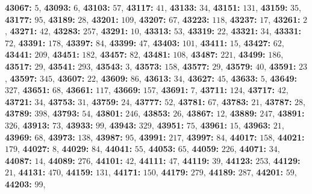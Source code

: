 \textsf{\bfseries 43067:} $5$, \textsf{\bfseries 43093:} $6$, \textsf{\bfseries 43103:} $57$, \textsf{\bfseries 43117:} $41$, \textsf{\bfseries 43133:} $34$, \textsf{\bfseries 43151:} $131$, \textsf{\bfseries 43159:} $35$, \textsf{\bfseries 43177:} $95$, \textsf{\bfseries 43189:} $28$, \textsf{\bfseries 43201:} $109$, \textsf{\bfseries 43207:} $67$, \textsf{\bfseries 43223:} $118$, \textsf{\bfseries 43237:} $17$, \textsf{\bfseries 43261:} $2$, \textsf{\bfseries 43271:} $42$, \textsf{\bfseries 43283:} $257$, \textsf{\bfseries 43291:} $10$, \textsf{\bfseries 43313:} $53$, \textsf{\bfseries 43319:} $22$, \textsf{\bfseries 43321:} $34$, \textsf{\bfseries 43331:} $72$, \textsf{\bfseries 43391:} $178$, \textsf{\bfseries 43397:} $84$, \textsf{\bfseries 43399:} $47$, \textsf{\bfseries 43403:} $101$, \textsf{\bfseries 43411:} $15$, \textsf{\bfseries 43427:} $62$, \textsf{\bfseries 43441:} $209$, \textsf{\bfseries 43451:} $182$, \textsf{\bfseries 43457:} $82$, \textsf{\bfseries 43481:} $108$, \textsf{\bfseries 43487:} $221$, \textsf{\bfseries 43499:} $186$, \textsf{\bfseries 43517:} $29$, \textsf{\bfseries 43541:} $293$, \textsf{\bfseries 43543:} $3$, \textsf{\bfseries 43573:} $158$, \textsf{\bfseries 43577:} $29$, \textsf{\bfseries 43579:} $40$, \textsf{\bfseries 43591:} $23$, \textsf{\bfseries 43597:} $345$, \textsf{\bfseries 43607:} $22$, \textsf{\bfseries 43609:} $86$, \textsf{\bfseries 43613:} $34$, \textsf{\bfseries 43627:} $45$, \textsf{\bfseries 43633:} $5$, \textsf{\bfseries 43649:} $327$, \textsf{\bfseries 43651:} $68$, \textsf{\bfseries 43661:} $117$, \textsf{\bfseries 43669:} $157$, \textsf{\bfseries 43691:} $7$, \textsf{\bfseries 43711:} $124$, \textsf{\bfseries 43717:} $42$, \textsf{\bfseries 43721:} $34$, \textsf{\bfseries 43753:} $31$, \textsf{\bfseries 43759:} $24$, \textsf{\bfseries 43777:} $52$, \textsf{\bfseries 43781:} $67$, \textsf{\bfseries 43783:} $21$, \textsf{\bfseries 43787:} $28$, \textsf{\bfseries 43789:} $398$, \textsf{\bfseries 43793:} $54$, \textsf{\bfseries 43801:} $246$, \textsf{\bfseries 43853:} $26$, \textsf{\bfseries 43867:} $12$, \textsf{\bfseries 43889:} $247$, \textsf{\bfseries 43891:} $326$, \textsf{\bfseries 43913:} $73$, \textsf{\bfseries 43933:} $99$, \textsf{\bfseries 43943:} $329$, \textsf{\bfseries 43951:} $75$, \textsf{\bfseries 43961:} $15$, \textsf{\bfseries 43963:} $21$, \textsf{\bfseries 43969:} $68$, \textsf{\bfseries 43973:} $138$, \textsf{\bfseries 43987:} $95$, \textsf{\bfseries 43991:} $217$, \textsf{\bfseries 43997:} $84$, \textsf{\bfseries 44017:} $158$, \textsf{\bfseries 44021:} $179$, \textsf{\bfseries 44027:} $8$, \textsf{\bfseries 44029:} $84$, \textsf{\bfseries 44041:} $55$, \textsf{\bfseries 44053:} $65$, \textsf{\bfseries 44059:} $226$, \textsf{\bfseries 44071:} $34$, \textsf{\bfseries 44087:} $14$, \textsf{\bfseries 44089:} $276$, \textsf{\bfseries 44101:} $42$, \textsf{\bfseries 44111:} $47$, \textsf{\bfseries 44119:} $39$, \textsf{\bfseries 44123:} $253$, \textsf{\bfseries 44129:} $21$, \textsf{\bfseries 44131:} $470$, \textsf{\bfseries 44159:} $131$, \textsf{\bfseries 44171:} $150$, \textsf{\bfseries 44179:} $279$, \textsf{\bfseries 44189:} $287$, \textsf{\bfseries 44201:} $59$, \textsf{\bfseries 44203:} $99$, 
